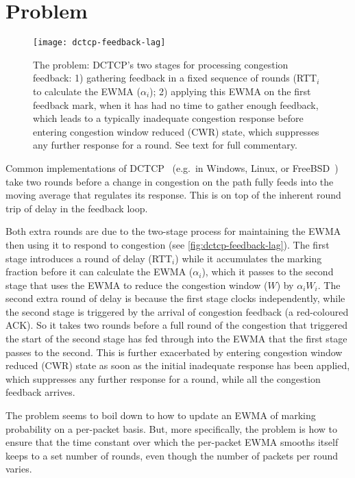 \section{Problem}\label{prresp_Problem}

\begin{figure*}
	\texttt{[image: dctcp-feedback-lag]}
	\caption{The problem: DCTCP's two stages for processing congestion feedback: 1) gathering feedback in a fixed sequence of rounds (RTT\(_i\) to calculate the EWMA (\(\alpha_i\)); 2) applying this EWMA on the first feedback mark, when it has had no time to gather enough feedback, which leads to a typically inadequate congestion response before entering congestion window reduced (CWR) state, which suppresses any further response for a round. See text for full commentary.}
	\label{fig:dctcp-feedback-lag}
\end{figure*}

Common implementations of DCTCP~\cite{Alizadeh10:DCTCP} (e.g.\ in Windows, Linux, or FreeBSD~\cite{Bensley17:DCTCP}) take two rounds before a change in congestion on the path fully feeds into the moving average that regulates its response. This is on top of the inherent round trip of delay in the feedback loop.

Both extra rounds are due to the two-stage process for maintaining the EWMA then using it to respond to congestion (see \autoref{fig:dctcp-feedback-lag}). The first stage introduces a round of delay (RTT\(_i\)) while it accumulates the marking fraction before it can calculate the EWMA (\(\alpha_i\)), which it passes to the second stage that uses the EWMA to reduce the congestion window (\(W\)) by \(\alpha_i W_i\). The second extra round of delay is because the first stage clocks independently, while the second stage is triggered by the arrival of congestion feedback (a red-coloured ACK). So it takes two rounds before a full round of the congestion that triggered the start of the second stage has fed through into the EWMA that the first stage passes to the second. This is further exacerbated by entering congestion window reduced (CWR) state as soon as the initial inadequate response has been applied, which suppresses any further response for a round, while all the congestion feedback arrives.

The problem seems to boil down to how to update an EWMA of marking probability on a per-packet basis. But, more specifically, the problem is how to ensure that the time constant over which the per-packet EWMA smooths itself keeps to a set number of rounds, even though the number of packets per round varies.

